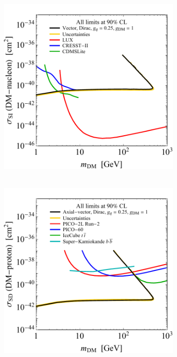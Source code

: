 \begin{figure}
         \centering
	\begin{subfigure}{0.45\textwidth}
		\centering
		\includegraphics[width=1\textwidth]{figure2}
		\caption{~}
		\label{fig:SI}
	\end{subfigure}
	\qquad 
	\begin{subfigure}{0.45\textwidth}
		\centering
		\includegraphics[width=1\textwidth]{figure3}

\end{subfigure}
\end{figure}
